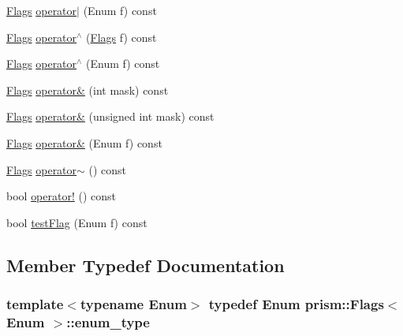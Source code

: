 \begin{DoxyCompactItemize}
\item 
\hyperlink{classprism_1_1_flags}{Flags} \hyperlink{classprism_1_1_flags_a1fbd3c6ffce171e8ed6ec1dab4691c71}{operator$\vert$} (Enum f) const 
\item 
\hyperlink{classprism_1_1_flags}{Flags} \hyperlink{classprism_1_1_flags_a63842ee8385e25893f0371387fbaae79}{operator$^\wedge$} (\hyperlink{classprism_1_1_flags}{Flags} f) const 
\item 
\hyperlink{classprism_1_1_flags}{Flags} \hyperlink{classprism_1_1_flags_a558ac268c605264e2379f022bab918f3}{operator$^\wedge$} (Enum f) const 
\item 
\hyperlink{classprism_1_1_flags}{Flags} \hyperlink{classprism_1_1_flags_a3db41a3026096495b17362cd78a84321}{operator\&} (int mask) const 
\item 
\hyperlink{classprism_1_1_flags}{Flags} \hyperlink{classprism_1_1_flags_ad1b35e1f4b8a12280fd44dda7ecf1106}{operator\&} (unsigned int mask) const 
\item 
\hyperlink{classprism_1_1_flags}{Flags} \hyperlink{classprism_1_1_flags_ab00e2ffaa70a3a679cd85d796eabbcec}{operator\&} (Enum f) const 
\item 
\hyperlink{classprism_1_1_flags}{Flags} \hyperlink{classprism_1_1_flags_a758fe3b9fe01e30804061f113eccd5fc}{operator$\sim$} () const 
\item 
bool \hyperlink{classprism_1_1_flags_a26c98a1f975fe23771992e9c6ad190e7}{operator!} () const 
\item 
bool \hyperlink{classprism_1_1_flags_af7ea559d83cf7a5374a08747311d9efe}{test\+Flag} (Enum f) const 
\end{DoxyCompactItemize}


\subsection{Member Typedef Documentation}
\subsubsection[{\texorpdfstring{enum\+\_\+type}{enum_type}}]{\setlength{\rightskip}{0pt plus 5cm}template$<$typename Enum$>$ typedef Enum {\bf prism\+::\+Flags}$<$ Enum $>$\+::{\bf enum\+\_\+type}}\hypertarget{classprism_1_1_flags_a2415ba62bc10f8590955edcb9c738e5b}{}\label{classprism_1_1_flags_a2415ba62bc10f8590955edcb9c738e5b}


